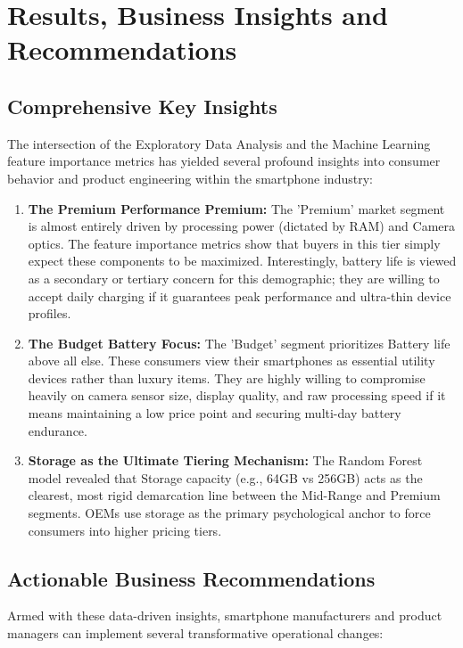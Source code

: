 \documentclass[12pt,a4paper]{article}
\begin{document}
\newpage
\section{Results, Business Insights and Recommendations}

\subsection{Comprehensive Key Insights}
The intersection of the Exploratory Data Analysis and the Machine Learning feature importance metrics has yielded several profound insights into consumer behavior and product engineering within the smartphone industry:

\begin{enumerate}
    \item \textbf{The Premium Performance Premium:} The 'Premium' market segment is almost entirely driven by processing power (dictated by RAM) and Camera optics. The feature importance metrics show that buyers in this tier simply expect these components to be maximized. Interestingly, battery life is viewed as a secondary or tertiary concern for this demographic; they are willing to accept daily charging if it guarantees peak performance and ultra-thin device profiles.
    \item \textbf{The Budget Battery Focus:} The 'Budget' segment prioritizes Battery life above all else. These consumers view their smartphones as essential utility devices rather than luxury items. They are highly willing to compromise heavily on camera sensor size, display quality, and raw processing speed if it means maintaining a low price point and securing multi-day battery endurance.
    \item \textbf{Storage as the Ultimate Tiering Mechanism:} The Random Forest model revealed that Storage capacity (e.g., 64GB vs 256GB) acts as the clearest, most rigid demarcation line between the Mid-Range and Premium segments. OEMs use storage as the primary psychological anchor to force consumers into higher pricing tiers.
\end{enumerate}

\subsection{Actionable Business Recommendations}
Armed with these data-driven insights, smartphone manufacturers and product managers can implement several transformative operational changes:
\end{document}
